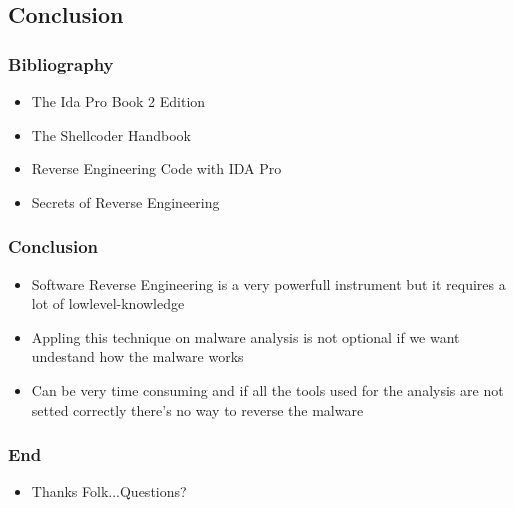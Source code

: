 \documentclass[]{beamer}
\begin{document}
		\subsection{Conclusion}
		\begin{frame}
			\frametitle{Bibliography}
			\begin{itemize}
				\item{The Ida Pro Book 2 Edition }
				\item{The Shellcoder Handbook}
				\item{Reverse Engineering Code with IDA Pro}
				\item{Secrets of Reverse Engineering}
			\end{itemize}
		\end{frame}
	 	\begin{frame}
			\frametitle{Conclusion}
			\begin{itemize}
				\item{Software Reverse Engineering is a very powerfull instrument but it requires a lot of lowlevel-knowledge }
				\item{Appling this technique on malware analysis is not optional if we want undestand how the malware works}
				\item{Can be very time consuming and if all the tools used for the analysis are not setted correctly there's no way to reverse the malware }
			\end{itemize}
		\end{frame}
		\begin{frame}
			\frametitle{End}
			\begin{itemize}
				\item{Thanks Folk...Questions?}
			\end{itemize}
		\end{frame}

\end{document}
